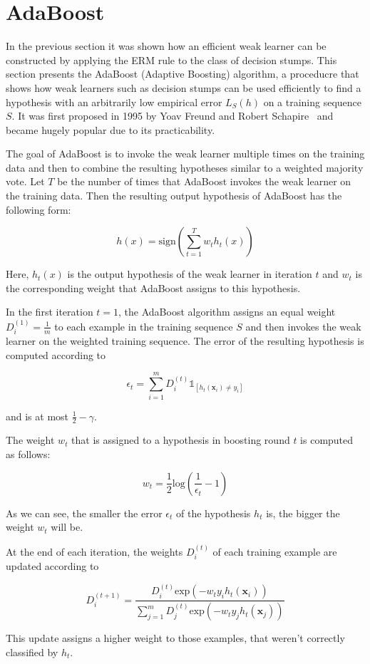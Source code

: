 \section{AdaBoost}
\label{sec:adaboost}

In the previous section it was shown how an efficient weak learner can be constructed by applying the ERM rule to
the class of decision stumps.
This section presents the AdaBoost (Adaptive Boosting) algorithm, a proceducre that shows 
how weak learners such as decision stumps can be
used efficiently to find a hypothesis with an arbitrarily low empirical error $L_S(h)$ on a training sequence $S$.
It was first proposed in 1995 by Yoav Freund and Robert Schapire~\cite{FREUND1997119} and became hugely popular
due to its practicability.

The goal of AdaBoost is to invoke the weak learner multiple times on the training data and then to combine
the resulting hypotheses similar to a weighted majority vote.
Let $T$ be the number of times that AdaBoost invokes the weak learner on the training data. Then the resulting
output hypothesis of AdaBoost has the following form:
\begin{linenomath*}
    $$
    h(x) = \text{sign}\left( \sum_{t=1}^T w_t h_t(x) \right)
    $$
\end{linenomath*}
Here, $h_t(x)$ is the output hypothesis of the weak learner in iteration $t$ and $w_t$ is the corresponding weight
that AdaBoost assigns to this hypothesis.

In the first iteration $t=1$, the AdaBoost algorithm assigns an equal weight $D_i^{(1)} = \frac{1}{m}$ to each example
in the training sequence $S$ and then invokes the weak learner on the weighted training sequence.
The error of the resulting hypothesis is computed according to
\begin{linenomath*}
    $$
    \epsilon_t = \sum_{i=1}^m D_i^{(t)} \mathds{1}_{\left[ h_t(\mathbf{x}_i) \neq y_i \right]}
    $$
\end{linenomath*}
and is at most $\frac{1}{2}-\gamma$.

The weight $w_t$ that is assigned to a hypothesis in boosting round $t$ is computed as follows:
\begin{linenomath*}
    $$
    w_t = \frac{1}{2} \text{log} \left( \frac{1}{\epsilon_t} - 1 \right)
    $$
\end{linenomath*}
As we can see, the smaller the error $\epsilon_t$ of the hypothesis $h_t$ is, the bigger the weight $w_t$ will be.

At the end of each iteration, the weights $D_i^{(t)}$ of each training example are updated according to
\begin{linenomath*}
    $$
    D_i^{(t+1)} = \frac{D_i^{(t)} \text{exp} \left( -w_t y_i h_t(\mathbf{x}_i) \right)}{
        \sum_{j=1}^m D_j^{(t)} \text{exp} \left( -w_t y_j h_t(\mathbf{x}_j) \right) }
    $$
\end{linenomath*}
This update assigns a higher weight to those examples, that weren't correctly classified by $h_t$.

